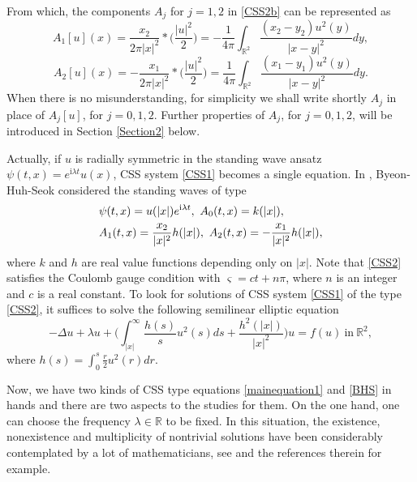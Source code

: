 \documentclass[11pt]{amsart}
\numberwithin{equation}{section}
\theoremstyle{definition}
\newcommand{\R}{\mathbb{R}}
\begin{document}
From which,
the components $A_j$ for $j=1,2$ in \eqref{CSS2b} can be represented as
\begin{equation}\label{CSS2e1}
	A_1[u](x)=\frac{x_2}{2\pi|x|^2}\ast\bigg(\frac{|u|^2}{2}\bigg)
	=-\frac{1}{4\pi }\int_{\R^2}\frac{(x_2-y_2)u^2(y)}{|x-y|^2}dy,
\end{equation}
\begin{equation}\label{CSS2e2}
	A_2[u](x) =-\frac{x_1}{2\pi|x|^2}\ast\bigg(\frac{|u|^2}{2}\bigg)
	=\frac{1}{4\pi }\int_{\R^2}\frac{(x_1-y_1)u^2(y)}{|x-y|^2}dy.
\end{equation}
When there is no misunderstanding, for simplicity we shall write shortly $A_j$ in place of $A_j[u]$, for $j=0,1,2$.
Further properties of $A_j$, for $j=0,1,2$, will be introduced in Section \ref{Section2} below.

Actually, if $u$ is radially symmetric in
the standing wave ansatz $\psi(t,x)=e^{\text{i}\lambda t}u(x)$,
CSS system \eqref{CSS1} becomes a single equation.
In \cite{Byeon}, Byeon-Huh-Seok considered the standing waves  of type
\begin{equation}\label{CSS2}
	\begin{gathered}
		\psi(t,x)=u(|x|)e^{\text{i}\lambda t},~  A_0(t,x)=k(|x|), \hfill\\
		A_1(t,x)=\frac{x_2}{|x|^2}h(|x|),~   A_2(t,x)=-\frac{x_1}{|x|^2}h(|x|),\hfill\\
	\end{gathered}
\end{equation}
where $k$ and $h$ are real value functions depending only on $|x|$. Note that \eqref{CSS2} satisfies the Coulomb gauge condition with $\varsigma=ct+n\pi$, where $n$ is
an integer and $c$ is a real constant. To look for solutions of CSS system \eqref{CSS1} of the type \eqref{CSS2}, it suffices to solve the
following semilinear elliptic equation
\begin{equation}\label{BHS}
	-\Delta u+ \lambda u+ \bigg(\int_{|x|}^\infty
	\frac{h(s)}{s}u^2(s)ds+\frac{h^2(|x|)}{|x|^2} \bigg)u=f(u)
	~\text{in}~\mathbb{R}^2,
\end{equation}
where $h(s)=\int_0^s\frac{r}{2}u^2(r)dr$.

Now, we have two kinds of CSS type equations \eqref{mainequation1} and \eqref{BHS} in hands
and there are two aspects to the studies for them.
On the one hand, one can choose the frequency $\lambda\in\R$ to be fixed.
In this situation, the existence, nonexistence and multiplicity of nontrivial solutions
have been considerably contemplated by a lot of mathematicians, see \cite{AP,CZT,KT,LOZ,LYY,PR,Shen,SSY,PSZZ,WT,DPS,JCZSA}
and the references therein for example.
\end{document}
